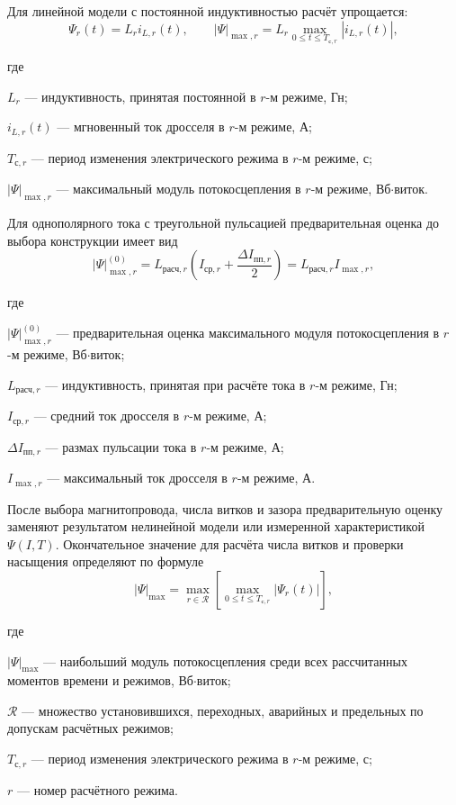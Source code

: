 \documentclass[14pt,a4paper]{extarticle}
\newenvironment{whereblock}
 {\par\noindent где\par
  \begin{list}{}{\setlength{\leftmargin}{12.5mm}
                  \setlength{\itemindent}{-12.5mm}
                  \setlength{\itemsep}{0pt}
                  \setlength{\parsep}{0pt}
                  \setlength{\topsep}{0pt}}}
 {\end{list}}
\newcommand{\whereitem}[2]{\item[] #1 --- #2}
\begin{document}
Для линейной модели с постоянной индуктивностью расчёт упрощается:
\begin{equation}
 \Psi_r(t)=L_r i_{L,r}(t),
 \qquad
 \left|\Psi\right|_{\max,r}=
 L_r\max_{0\leq t\leq T_{\text{с},r}}\left|i_{L,r}(t)\right|,
 \label{eq:flux-linkage-linear-maximum}
\end{equation}
\begin{whereblock}
\whereitem{$L_r$}{индуктивность, принятая постоянной в $r$-м режиме, Гн;}
\whereitem{$i_{L,r}(t)$}{мгновенный ток дросселя в $r$-м режиме, А;}
\whereitem{$T_{\text{с},r}$}{период изменения электрического режима в
$r$-м режиме, с;}
\whereitem{$\left|\Psi\right|_{\max,r}$}{максимальный модуль
потокосцепления в $r$-м режиме, Вб$\cdot$виток.}
\end{whereblock}

Для однополярного тока с треугольной пульсацией предварительная оценка до
выбора конструкции имеет вид
\begin{equation}
 \left|\Psi\right|_{\max,r}^{(0)}=
 L_{\text{расч},r}
 \left(
 I_{\text{ср},r}+\frac{\Delta I_{\text{пп},r}}{2}
 \right)
 =L_{\text{расч},r}I_{\max,r},
 \label{eq:flux-linkage-preliminary}
\end{equation}
\begin{whereblock}
\whereitem{$\left|\Psi\right|_{\max,r}^{(0)}$}{предварительная оценка
максимального модуля потокосцепления в $r$-м режиме, Вб$\cdot$виток;}
\whereitem{$L_{\text{расч},r}$}{индуктивность, принятая при расчёте тока в
$r$-м режиме, Гн;}
\whereitem{$I_{\text{ср},r}$}{средний ток дросселя в $r$-м режиме, А;}
\whereitem{$\Delta I_{\text{пп},r}$}{размах пульсации тока в $r$-м режиме,
А;}
\whereitem{$I_{\max,r}$}{максимальный ток дросселя в $r$-м режиме, А.}
\end{whereblock}

После выбора магнитопровода, числа витков и зазора предварительную оценку
заменяют результатом нелинейной модели или измеренной характеристикой
$\Psi(I,T)$. Окончательное значение для расчёта числа витков и проверки
насыщения определяют по формуле
\begin{equation}
 \left|\Psi\right|_{\max}=
 \max_{r\in\mathcal R}
 \left[
 \max_{0\leq t\leq T_{\text{с},r}}\left|\Psi_r(t)\right|
 \right],
 \label{eq:flux-linkage-global-maximum}
\end{equation}
\begin{whereblock}
\whereitem{$\left|\Psi\right|_{\max}$}{наибольший модуль потокосцепления
среди всех рассчитанных моментов времени и режимов, Вб$\cdot$виток;}
\whereitem{$\mathcal R$}{множество установившихся, переходных, аварийных и
предельных по допускам расчётных режимов;}
\whereitem{$T_{\text{с},r}$}{период изменения электрического режима в
$r$-м режиме, с;}
\whereitem{$r$}{номер расчётного режима.}
\end{whereblock}
\end{document}
